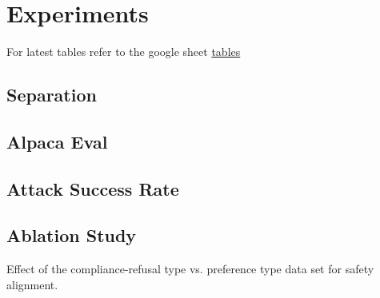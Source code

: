\documentclass{article}
\begin{document}
\section{Experiments}
For latest tables refer to the google sheet \href{https://docs.google.com/spreadsheets/d/1haVI6s-2i3GIRRVsFl85PRDXd-qo14iMigE8cUOyd_k/edit?usp=sharing}{tables}
\subsection{Separation}

\subsection{Alpaca Eval}


\subsection{Attack Success Rate}


\subsection{Ablation Study}
Effect of the compliance-refusal type vs. preference type data set for safety alignment.


\end{document}
